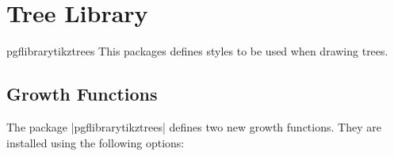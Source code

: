 %




\section{Tree Library}

\label{section-tree-library}


\begin{package}{pgflibrarytikztrees}
  This packages defines styles to be used when drawing trees. 
\end{package}

\subsection{Growth Functions}

The package |pgflibrarytikztrees| defines two new growth
functions. They are installed using the following options:

